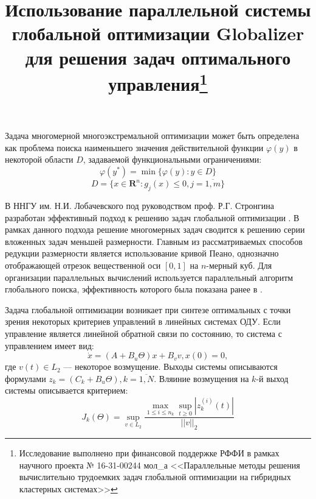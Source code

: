 \documentclass[11pt, oneside, a4paper]{article}
\begin{document}

\title{Использование параллельной системы глобальной оптимизации Globalizer для
решения задач оптимального управления\footnote{Исследование выполнено при финансовой
поддержке РФФИ в рамках научного проекта № 16-31-00244 мол\_а <<Параллельные методы
решения вычислительно трудоемких задач глобальной оптимизации на гибридных кластерных системах>>}}


Задача многомерной многоэкстремальной оптимизации может быть определена как проблема
поиска наименьшего значения действительной функции \(\varphi(y)\) в некоторой области \(D\),
задаваемой функциональными ограничениями:
\begin{displaymath}
  \label{task}
    \varphi(y^*)=\min\{\varphi(y):y\in D\}
\end{displaymath}
\begin{displaymath}
  D=\{x\in \mathbf{R}^n: g_j(x) \le 0, j=\overline{1,m}\}
\end{displaymath}

В ННГУ им. Н.И. Лобачевского под руководством проф. Р.Г. Стронгина разработан
эффективный подход к решению задач глобальной оптимизации \cite{strGergrParOptBook}.
В рамках данного подхода решение многомерных задач сводится к решению серии вложенных задач меньшей размерности.
Главным из рассматриваемых способов редукции размерности является использование кривой Пеано,
однозначно отображающей отрезок вещественной оси \([0,1]\) на \(n\)-мерный куб.
Для организации параллельных вычислений используется параллельный алгоритм глобального поиска,
эффективность которого была показана ранее в \cite{parallelMethod}.

Задача глобальной оптимизации возникает при синтезе оптимальных с точки зрения некоторых критериев управлений в линейных системах ОДУ.
Если управление является линейной обратной связи по состоянию, то система с управлением имеет вид:
\begin{displaymath}
    \dot x = (A+B_u\Theta)x + B_v v, x(0)=0,
\end{displaymath}
где  \(v(t)\in L_2\) --- некоторое возмущение.
Выходы системы описываются формулами \(z_k=(C_k+B_u\Theta),k=\overline{1,N}\).
Вляиние возмущения на \(k\)-й выход системы описывается критерием:
\begin{displaymath}
  J_k(\Theta)=\sup_{v\in L_2} \frac{\max_{1\le i \le n_k} \sup_{t\ge 0}|z_k^{(i)}(t)|}{||v||_2}
\end{displaymath}
\end{document}
